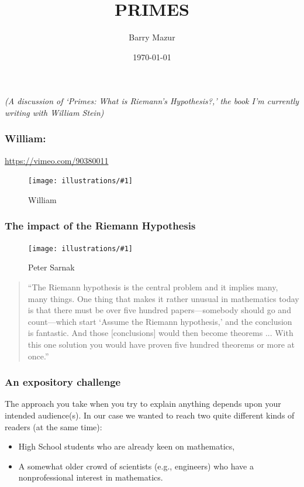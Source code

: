 \documentclass{beamer}
\title{PRIMES}
\author{Barry Mazur}
\date{\today}
\newcommand{\ill}[3]{%
   \begin{figure}[H]%
   \vspace{-2ex}
   \centering%
   \texttt{[image: illustrations/\#1]}%
   \caption{#3}%
   \vspace{-2ex}
    \end{figure}}
\begin{document}
\begin{frame}
\titlepage

{\it (A discussion of `Primes: What is Riemann's Hypothesis?,' the book I'm currently writing with William Stein)}
\end{frame}

\begin{frame}
\frametitle{William:}
\begin{center}\LARGE
\url{https://vimeo.com/90380011}
\end{center}
\ill{steinbsair}{0.7}{William}
\end{frame}
\begin{frame}

\frametitle{The impact of the Riemann Hypothesis}
\ill{sarnak}{0.20}{Peter Sarnak}

\begin{quote}
``The Riemann hypothesis is the central problem and it implies many,
many things. One thing that makes it rather unusual in mathematics
today is that there must be over five hundred papers---somebody should
go and count---which start `Assume the Riemann hypothesis,' and
the conclusion is fantastic. And those [conclusions] would then become
theorems ... With this one solution you would have proven five hundred
theorems or more at once.''
\end{quote}

\end{frame}
\begin{frame}
\frametitle{An expository challenge}
     The approach you take when you try to explain anything depends upon your intended audience(s).  In our case we wanted to reach two quite different kinds of readers (at the same time):
     \vskip20pt
     \begin{itemize} \item High School students who are already keen on mathematics,
        \vskip20pt
     \item A somewhat  older crowd of scientists (e.g., engineers)  who have a nonprofessional interest in mathematics.
     \end{itemize}
\end{frame}
\end{document}
